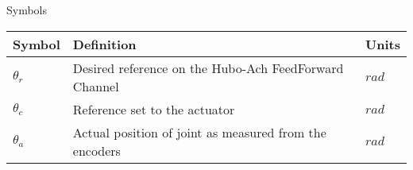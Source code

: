 \Large
\centering
Symbols\\
\normalsize
\begin{tabular}{l | l | l}
\hline
Symbol     & Definition                                                & Units \\
\hline
$\theta_r$ & Desired reference on the Hubo-Ach FeedForward Channel     & $rad$ \\
\hline
$\theta_c$ & Reference set to the actuator                             & $rad$ \\
\hline
$\theta_a$ & Actual position of joint as measured from the encoders    & $rad$ \\
\hline
\end{tabular}
